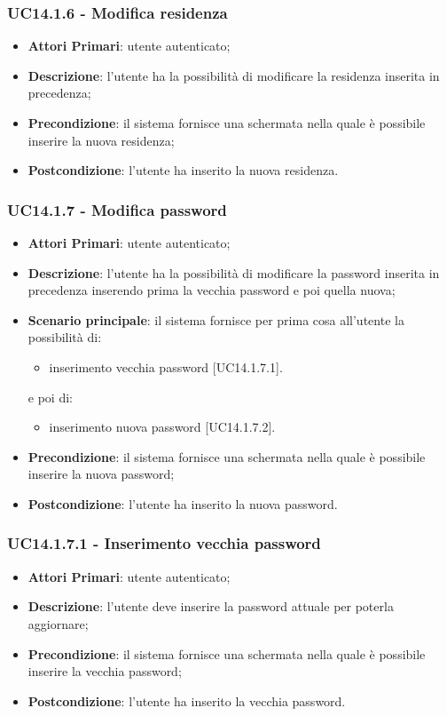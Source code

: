 \subsubsection{UC14.1.6 - Modifica residenza}
\begin{itemize}
	\item \textbf{Attori Primari}: utente autenticato;
	\item \textbf{Descrizione}: l'utente ha la possibilità di modificare la residenza inserita in precedenza;
	\item \textbf{Precondizione}: il sistema fornisce una schermata nella quale è possibile inserire la nuova residenza;
	\item \textbf{Postcondizione}: l'utente ha inserito la nuova residenza.
\end{itemize}

\subsubsection{UC14.1.7 - Modifica password}
\begin{itemize}
	\item \textbf{Attori Primari}: utente autenticato;
	\item \textbf{Descrizione}: l'utente ha la possibilità di modificare la password inserita in precedenza inserendo prima la vecchia password e poi quella nuova;
	\item \textbf{Scenario principale}: il sistema fornisce per prima cosa all'utente la possibilità di:
		\begin{itemize}
			\item inserimento vecchia password [UC14.1.7.1].
		\end{itemize}
	e poi di:
		\begin{itemize}
			\item inserimento nuova password [UC14.1.7.2].
		\end{itemize}
	\item \textbf{Precondizione}: il sistema fornisce una schermata nella quale è possibile inserire la nuova password;
	\item \textbf{Postcondizione}: l'utente ha inserito la nuova password.
\end{itemize}

\subsubsection{UC14.1.7.1 - Inserimento vecchia password}
\begin{itemize}
	\item \textbf{Attori Primari}: utente autenticato;
	\item \textbf{Descrizione}: l'utente deve inserire la password attuale per poterla aggiornare;
	\item \textbf{Precondizione}: il sistema fornisce una schermata nella quale è possibile inserire la vecchia password;
	\item \textbf{Postcondizione}: l'utente ha inserito la vecchia password.
\end{itemize}

